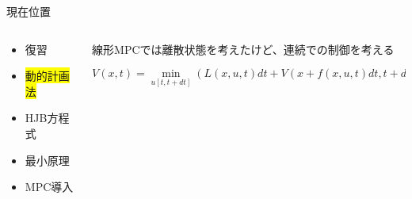 \documentclass[dvipdfmx,12pt]{beamer}
\begin{document}
    \begin{frame}{現在位置}
        \footnotesize
        \begin{columns}
            \begin{column}{.35\textwidth}
                \begin{itemize}
                    \item 復習
                    \item \colorbox{yellow}{動的計画法}
                    \item HJB方程式
                    \item 最小原理
                    \item MPC導入
                \end{itemize}
            \end{column}
    
            \begin{column}{.7\textwidth}
                線形MPCでは離散状態を考えたけど、連続での制御を考える \\
                \fontsize{6.5pt}{3.5pt}\selectfont
                \begin{tcolorbox}[title=Bellman方程式]
                    \begin{equation*}
                        V(x, t) = \min_{u[t, t+dt]} \left( L(x, u, t) dt + V \left( x + f(x, u, t) dt, t + dt \right) \right)
                    \end{equation*}
                \end{tcolorbox}
                
            \end{column}
        \end{columns}
    \end{frame}
\end{document}

